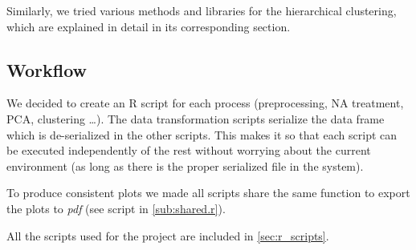 Similarly, we tried various methods and libraries for the hierarchical
clustering, which are explained in detail in its corresponding section.

\subsection{Workflow}%
\label{sub:workflow}

We decided to create an R script for each process (preprocessing, NA treatment,
PCA, clustering \dots). The data transformation scripts serialize the data frame
which is de-serialized in the other scripts. This makes it so that each script
can be executed independently of the rest without worrying about the current
environment (as long as there is the proper serialized file in the system).

To produce consistent plots we made all scripts share the same function to
export the plots to \emph{pdf} (see script in \cref{sub:shared.r}).

All the scripts used for the project are included in \cref{sec:r_scripts}.

